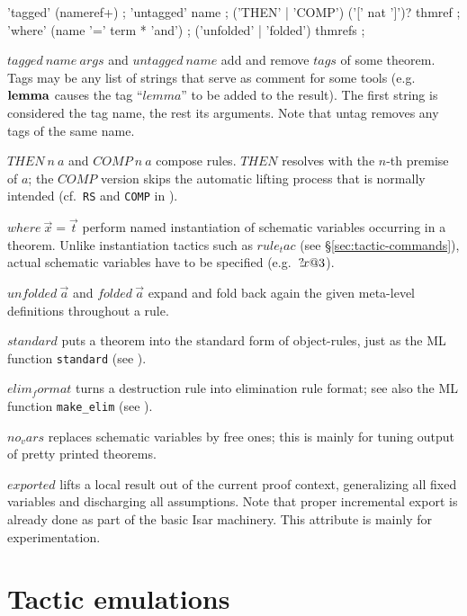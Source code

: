 \begin{rail}
  'tagged' (nameref+)
  ;
  'untagged' name
  ;
  ('THEN' | 'COMP') ('[' nat ']')? thmref
  ;
  'where' (name '=' term * 'and')
  ;
  ('unfolded' | 'folded') thmrefs
  ;
\end{rail}

\begin{descr}
\item [$tagged~name~args$ and $untagged~name$] add and remove $tags$ of some
  theorem.  Tags may be any list of strings that serve as comment for some
  tools (e.g.\ ${\mathord{\mathbf{lemma}}}$ causes the tag ``$lemma$'' to be added to the
  result).  The first string is considered the tag name, the rest its
  arguments.  Note that untag removes any tags of the same name.
\item [$THEN~n~a$ and $COMP~n~a$] compose rules.  $THEN$ resolves with the
  $n$-th premise of $a$; the $COMP$ version skips the automatic lifting
  process that is normally intended (cf.\ \texttt{RS} and \texttt{COMP} in
  \cite[\S5]{isabelle-ref}).
\item [$where~\vec x = \vec t$] perform named instantiation of schematic
  variables occurring in a theorem.  Unlike instantiation tactics such as
  $rule_tac$ (see \S\ref{sec:tactic-commands}), actual schematic variables
  have to be specified (e.g.\ ${?\!x@3}$).
\item [$unfolded~\vec a$ and $folded~\vec a$] expand and fold back again the
  given meta-level definitions throughout a rule.
\item [$standard$] puts a theorem into the standard form of object-rules, just
  as the ML function \texttt{standard} (see \cite[\S5]{isabelle-ref}).
\item [$elim_format$] turns a destruction rule into elimination rule format;
  see also the ML function \texttt{make\_elim} (see \cite{isabelle-ref}).
\item [$no_vars$] replaces schematic variables by free ones; this is mainly
  for tuning output of pretty printed theorems.
\item [$exported$] lifts a local result out of the current proof context,
  generalizing all fixed variables and discharging all assumptions.  Note that
  proper incremental export is already done as part of the basic Isar
  machinery.  This attribute is mainly for experimentation.
\end{descr}


\section{Tactic emulations}\label{sec:tactics}

